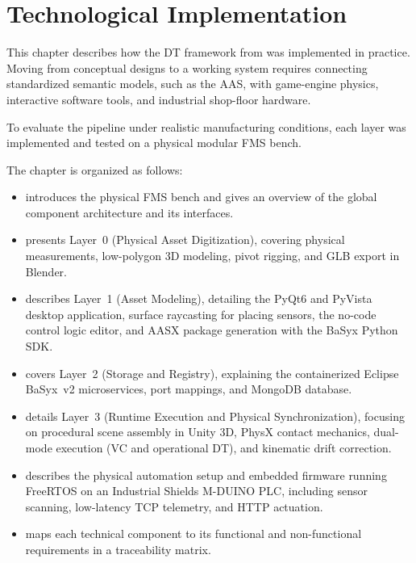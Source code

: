 
%

\chapter{Technological Implementation}
\label{cha:implementation}

This chapter describes how the \gls{DT} framework from  was implemented in practice. Moving from conceptual designs to a working system requires connecting standardized semantic models, such as the \gls{AAS}, with game-engine physics, interactive software tools, and industrial shop-floor hardware.

To evaluate the pipeline under realistic manufacturing conditions, each layer was implemented and tested on a physical modular \gls{FMS} bench.

The chapter is organized as follows:
\begin{itemize}
    \item {} introduces the physical \gls{FMS} bench and gives an overview of the global component architecture and its interfaces.
    \item {} presents Layer~0 (Physical Asset Digitization), covering physical measurements, low-polygon 3D modeling, pivot rigging, and \gls{GLB} export in Blender.
    \item {} describes Layer~1 (Asset Modeling), detailing the PyQt6 and PyVista desktop application, surface raycasting for placing sensors, the no-code control logic editor, and \gls{AASX} package generation with the BaSyx Python \gls{SDK}.
    \item {} covers Layer~2 (Storage and Registry), explaining the containerized Eclipse BaSyx~v2 microservices, port mappings, and MongoDB database.
    \item {} details Layer~3 (Runtime Execution and Physical Synchronization), focusing on procedural scene assembly in Unity 3D, PhysX contact mechanics, dual-mode execution (\gls{VC} and operational \gls{DT}), and kinematic drift correction.
    \item {} describes the physical automation setup and embedded firmware running FreeRTOS on an Industrial Shields M-DUINO \gls{PLC}, including sensor scanning, low-latency \gls{TCP} telemetry, and \gls{HTTP} actuation.
    \item {} maps each technical component to its functional and non-functional requirements in a traceability matrix.
\end{itemize}

